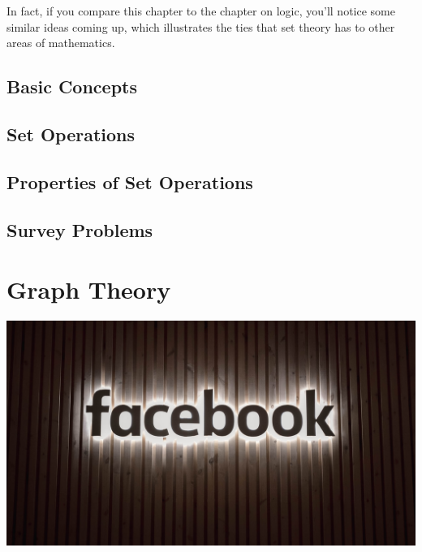 \documentclass[9pt,letter,twoside,openright]{memoir}
\begin{document}
In fact, if you compare this chapter to the chapter on logic, you'll notice some similar ideas coming up, which illustrates the ties that set theory has to other areas of mathematics.
\vfill
\pagebreak

\section{Basic Concepts}



\section{Set Operations}



\section{Properties of Set Operations}



\section{Survey Problems}



\chapter{Graph Theory}
\begin{center}\includegraphics[width=\textwidth]{facebook1}\end{center}
\end{document}

